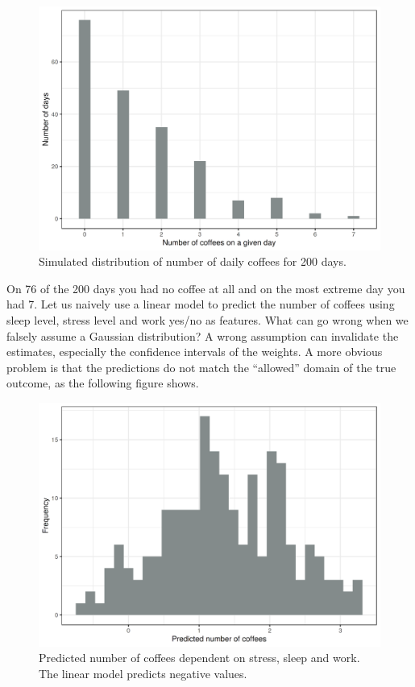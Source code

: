 \documentclass[12pt,]{krantz}
\begin{document}
\begin{figure}

{\centering \includegraphics[width=\textwidth]{images/poisson-data-1} 

}

\caption{Simulated distribution of number of daily coffees for 200 days.}\label{fig:poisson-data}
\end{figure}

On 76 of the 200 days you had no coffee at all and on the most extreme
day you had 7. Let us naively use a linear model to predict the number
of coffees using sleep level, stress level and work yes/no as features.
What can go wrong when we falsely assume a Gaussian distribution? A
wrong assumption can invalidate the estimates, especially the confidence
intervals of the weights. A more obvious problem is that the predictions
do not match the ``allowed'' domain of the true outcome, as the
following figure shows.

\begin{figure}

{\centering \includegraphics[width=\textwidth]{images/failing-linear-model-1} 

}

\caption{Predicted number of coffees dependent on stress, sleep and work. The linear model predicts negative values.}\label{fig:failing-linear-model}
\end{figure}
\end{document}
